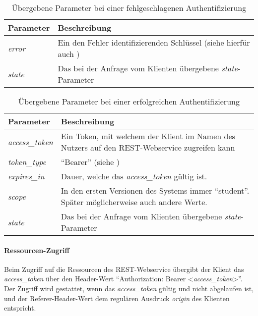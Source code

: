 \begin{table}
	\begin{tabularx}{\textwidth}{@{} | X | X | @{}}
		\hline
		\textbf{Parameter} & \textbf{Beschreibung}\\ \hline \hline
		\textit{error} & Ein den Fehler identifizierenden Schlüssel (siehe hierfür auch \cite[Kap. 4.2.2.1]{rfc6749})\\ \hline
		\textit{state} & Das bei der Anfrage vom Klienten übergebene \textit{state}-Parameter\\
		\hline
	\end{tabularx}
	\caption{Übergebene Parameter bei einer fehlgeschlagenen Authentifizierung}
	\label{tab:api-auth-login-res-error}
\end{table}

\begin{table}
	\begin{tabularx}{\textwidth}{@{} | X | X | @{}}
		\hline
		\textbf{Parameter} & \textbf{Beschreibung}\\ \hline \hline
		\textit{access\_token} & Ein Token, mit welchem der Klient im Namen des Nutzers auf den REST-Webservice zugreifen kann\\ \hline
		\textit{token\_type} & \enquote{Bearer} (siehe \cite[Kap. 7.1]{rfc6749}) \\ \hline
		\textit{expires\_in} & Dauer, welche das \textit{access\_token} gültig ist. \\ \hline
		\textit{scope} & In den ersten Versionen des Systems immer \enquote{student}. Später möglicherweise auch andere Werte.\\ \hline
		\textit{state} & Das bei der Anfrage vom Klienten übergebene \textit{state}-Parameter\\
		\hline
	\end{tabularx}
	\caption{Übergebene Parameter bei einer erfolgreichen Authentifizierung}
	\label{tab:api-auth-login-res-success}
\end{table}

\paragraph{Ressourcen-Zugriff}
Beim Zugriff auf die Ressourcen des REST-Webservice übergibt der Klient das \textit{access\_token} über den Header-Wert \enquote{Authorization: Bearer <\textit{access_token}>}.
Der Zugriff wird gestattet, wenn das \textit{access\_token} gültig und nicht abgelaufen ist, und der Referer-Header-Wert dem regulären Ausdruck \textit{origin} des Klienten entspricht.